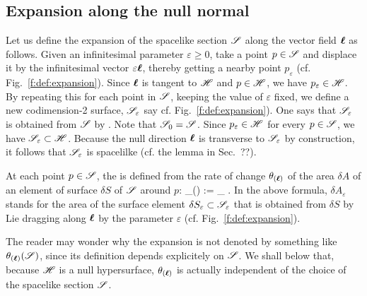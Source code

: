 \subsection{Expansion along the null normal}

Let us define the expansion of the spacelike section $\mathscr{S}$ along the vector
field $\bm{\ell}$ as follows. Given an infinitesimal parameter $\varepsilon\geq 0$, take a point
$p\in \mathscr{S}$ and displace it by the infinitesimal vector $\varepsilon \bm{\ell}$, thereby getting
a nearby point $p_\varepsilon$ (cf. Fig.~\ref{f:def:expansion}).
Since $\bm{\ell}$ is tangent to $\mathscr{H}$ and $p\in\mathscr{H}$, we have $p_\varepsilon\in\mathscr{H}$.
By repeating this for each point in $\mathscr{S}$,
keeping the value of $\varepsilon$ fixed, we define a new codimension-2 surface,
$\mathscr{S}_\varepsilon$ say cf. Fig.~\ref{f:def:expansion}). One says that $\mathscr{S}_\varepsilon$ is obtained
from $\mathscr{S}$ by .
Note that $\mathscr{S}_0 = \mathscr{S}$.
Since $p_\varepsilon\in\mathscr{H}$ for every $p\in\mathscr{S}$, we have $\mathscr{S}_\varepsilon\subset \mathscr{H}$.
Because the null direction $\bm{\ell}$ is transverse to $\mathscr{S}_\varepsilon$ by construction, it
follows that $\mathscr{S}_\varepsilon$ is spacelilke (cf. the lemma in Sec.~??).

At each point $p\in\mathscr{S}$, the  is defined from the
rate of change $\theta_{(\bm{\ell})}$ of the area $\delta A$ of an element of surface $\delta S$ of
$\mathscr{S}$ around $p$:
\be \label{e:def:def_expansion}
    \theta_{(\wl)} := \lim_{\varepsilon{}} 
     .
\ee
In the above formula, $\delta A_\varepsilon$ stands for the area of the
surface element $\delta S_\varepsilon\subset \mathscr{S}_\varepsilon$ that is obtained from $\delta S$ by
Lie dragging along $\bm{\ell}$ by the parameter $\varepsilon$ (cf. Fig.~\ref{f:def:expansion}).
\begin{remark} \label{r:def:expansion_indpt_S}
The reader may wonder why the expansion is not denoted by something like
$\theta_{(\bm{\ell})}(\mathscr{S})$, since its definition depends explicitely on
$\mathscr{S}$. We shall below that, because $\mathscr{H}$ is a null hypersurface, $\theta_{(\bm{\ell})}$
is actually independent of the choice of the spacelike section $\mathscr{S}$.
\end{remark}


